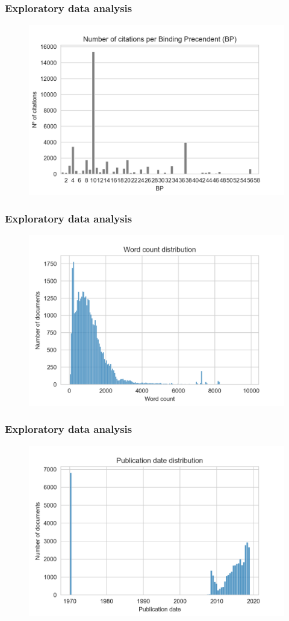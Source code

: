 \documentclass{beamer}
\begin{document}
    \begin{frame}
        \frametitle{Exploratory data analysis}
        \begin{figure}
            \centering
            \includegraphics[width=0.8\linewidth]{bp_citations.png}
        \end{figure}
    \end{frame}

    \begin{frame}
        \frametitle{Exploratory data analysis}
        \begin{figure}
            \centering
            \includegraphics[width=0.8\linewidth]{word_count.png}
        \end{figure}
    \end{frame}

    \begin{frame}
        \frametitle{Exploratory data analysis}
        \begin{figure}
            \centering
            \includegraphics[width=0.8\linewidth]{dates.png}
        \end{figure}
    \end{frame}
\end{document}
